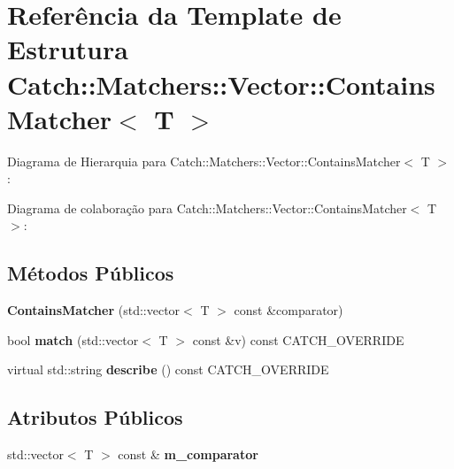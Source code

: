 \hypertarget{structCatch_1_1Matchers_1_1Vector_1_1ContainsMatcher}{}\section{Referência da Template de Estrutura Catch\+:\+:Matchers\+:\+:Vector\+:\+:Contains\+Matcher$<$ T $>$}
\label{structCatch_1_1Matchers_1_1Vector_1_1ContainsMatcher}


Diagrama de Hierarquia para Catch\+:\+:Matchers\+:\+:Vector\+:\+:Contains\+Matcher$<$ T $>$\+:


Diagrama de colaboração para Catch\+:\+:Matchers\+:\+:Vector\+:\+:Contains\+Matcher$<$ T $>$\+:
\subsection*{Métodos Públicos}
\begin{DoxyCompactItemize}
\item 
{\bfseries Contains\+Matcher} (std\+::vector$<$ T $>$ const \&comparator)\hypertarget{structCatch_1_1Matchers_1_1Vector_1_1ContainsMatcher_ad8e92c8399be6dce75bb5702cdfab700}{}\label{structCatch_1_1Matchers_1_1Vector_1_1ContainsMatcher_ad8e92c8399be6dce75bb5702cdfab700}

\item 
bool {\bfseries match} (std\+::vector$<$ T $>$ const \&v) const C\+A\+T\+C\+H\+\_\+\+O\+V\+E\+R\+R\+I\+DE\hypertarget{structCatch_1_1Matchers_1_1Vector_1_1ContainsMatcher_aba81516816a6796124dd4fe4843e7284}{}\label{structCatch_1_1Matchers_1_1Vector_1_1ContainsMatcher_aba81516816a6796124dd4fe4843e7284}

\item 
virtual std\+::string {\bfseries describe} () const C\+A\+T\+C\+H\+\_\+\+O\+V\+E\+R\+R\+I\+DE\hypertarget{structCatch_1_1Matchers_1_1Vector_1_1ContainsMatcher_add1a31f049cec89f980424ecdb7027ac}{}\label{structCatch_1_1Matchers_1_1Vector_1_1ContainsMatcher_add1a31f049cec89f980424ecdb7027ac}

\end{DoxyCompactItemize}
\subsection*{Atributos Públicos}
\begin{DoxyCompactItemize}
\item 
std\+::vector$<$ T $>$ const \& {\bfseries m\+\_\+comparator}\hypertarget{structCatch_1_1Matchers_1_1Vector_1_1ContainsMatcher_a83d051166e4ed0d535219ad6ee99abb2}{}\label{structCatch_1_1Matchers_1_1Vector_1_1ContainsMatcher_a83d051166e4ed0d535219ad6ee99abb2}

\end{DoxyCompactItemize}


